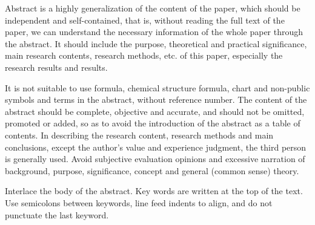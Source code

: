 \begin{eabstract}

  Abstract is a highly generalization of the content of the paper, which should be independent and self-contained, that is, without reading the full text of the paper, we can understand the necessary information of the whole paper through the abstract. It should include the purpose, theoretical and practical significance, main research contents, research methods, etc. of this paper, especially the research results and results.

  It is not suitable to use formula, chemical structure formula, chart and non-public symbols and terms in the abstract, without reference number. The content of the abstract should be complete, objective and accurate, and should not be omitted, promoted or added, so as to avoid the introduction of the abstract as a table of contents. In describing the research content, research methods and main conclusions, except the author’s value and experience judgment, the third person is generally used. Avoid subjective evaluation opinions and excessive narration of background, purpose, significance, concept and general (common sense) theory.

  Interlace the body of the abstract. Key words are written at the top of the text. Use semicolons between keywords, line feed indents to align, and do not punctuate the last keyword.

\end{eabstract}

